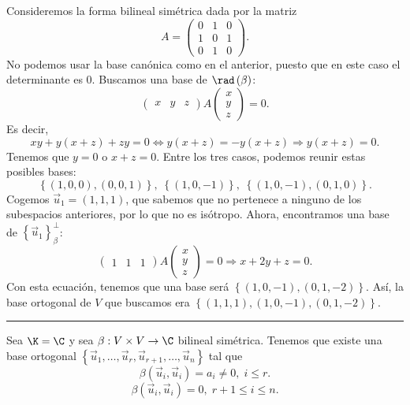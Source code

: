 \begin{eg}
\normalfont Consideremos la forma bilineal simétrica dada por la matriz 
\[ A = \begin{pmatrix} 0 & 1 & 0 \\
1 & 0 & 1 \\
0 & 1 & 0\end{pmatrix} .\]
No podemos usar la base canónica como en el anterior, puesto que en este caso el determinante es 0. Buscamos una base de $\displaystyle \rad\left(\beta \right) $: 
	\[ \begin{pmatrix} x & y & z \end{pmatrix} A \begin{pmatrix} x \\ y \\ z \end{pmatrix} = 0 .\]
Es decir, 
\[ xy + y\left(x + z\right) + zy = 0 \iff y\left(x + z\right) = -y\left(x+z\right) \Rightarrow y\left(x + z\right) = 0 .\]
Tenemos que $\displaystyle y = 0 $ o $\displaystyle x + z = 0$. Entre los tres casos, podemos reunir estas posibles bases:
\[ \left\{ \left(1,0,0\right), \left(0,0,1\right)\right\}, \; \left\{ \left(1,0,-1\right)\right\} , \; \left\{ \left(1,0,-1\right),\left(0,1,0\right)\right\}  .\]
Cogemos $\displaystyle \vec{u}_{1} = \left(1,1,1\right) $, que sabemos que no pertenece a ninguno de los subespacios anteriores, por lo que no es isótropo. Ahora, encontramos una base de $\displaystyle \left\{ \vec{u}_{1}\right\} ^{\perp }_{\beta } $:
\[ \begin{pmatrix} 1 & 1 & 1 \end{pmatrix}A\begin{pmatrix} x \\ y \\ z \end{pmatrix} = 0 \Rightarrow x + 2y +z = 0 .\]
Con esta ecuación, tenemos que una base será $\displaystyle \left\{ \left(1,0,-1\right), \left(0,1,-2\right)\right\}  $. Así, la base ortogonal de $\displaystyle V $ que buscamos era $\displaystyle \left\{ \left(1,1,1\right), \left(1,0,-1\right), \left(0,1,-2\right)\right\}  $.
\end{eg}
\noindent\rule{15.5cm}{0.4pt}
Sea $\displaystyle \K = \C $ y sea $\displaystyle \beta : V \times V \to \C  $ bilineal simétrica. Tenemos que existe una base ortogonal $\displaystyle \left\{ \vec{u}_{1}, \ldots, \vec{u}_{r}, \vec{u}_{r+1}, \ldots, \vec{u}_{n}\right\}  $ tal que 
\[ \beta\left(\vec{u}_{i}, \vec{u}_{i}\right) = a_{i} \neq 0, \; i \leq r .\]
\[ \beta\left(\vec{u}_{i}, \vec{u}_{i}\right) = 0, \; r + 1 \leq i \leq n .\]
